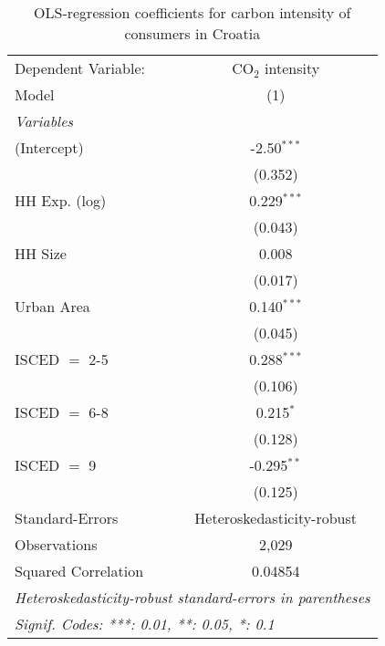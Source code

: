 
\begin{table}[htbp!]
   \centering
   \small
   \begin{adjustbox}{width = 1\textwidth, max height = 0.95\textheight, center}
      \begin{threeparttable}[b]
         \caption{\label{tab:OLS_1_HRV} OLS-regression coefficients for carbon intensity of consumers in Croatia}
         \begin{tabular}{lc}
            \tabularnewline \midrule \midrule
            Dependent Variable: & CO$_{2}$ intensity\\  
            Model               & (1)\\  
            \midrule
            \emph{Variables}\\
            (Intercept)         & -2.50$^{***}$\\   
                                & (0.352)\\   
            HH Exp. (log)       & 0.229$^{***}$\\   
                                & (0.043)\\   
            HH Size             & 0.008\\   
                                & (0.017)\\   
            Urban Area          & 0.140$^{***}$\\   
                                & (0.045)\\   
            ISCED $=$ 2-5       & 0.288$^{***}$\\   
                                & (0.106)\\   
            ISCED $=$ 6-8       & 0.215$^{*}$\\   
                                & (0.128)\\   
            ISCED $=$ 9         & -0.295$^{**}$\\   
                                & (0.125)\\   
            \midrule 
            Standard-Errors     & Heteroskedasticity-robust \\   
            Observations        & 2,029\\  
            Squared Correlation & 0.04854\\  
            \midrule \midrule
            \multicolumn{2}{l}{\emph{Heteroskedasticity-robust standard-errors in parentheses}}\\
            \multicolumn{2}{l}{\emph{Signif. Codes: ***: 0.01, **: 0.05, *: 0.1}}\\
         \end{tabular}
         

\end{threeparttable}
\end{adjustbox}
\end{table}
